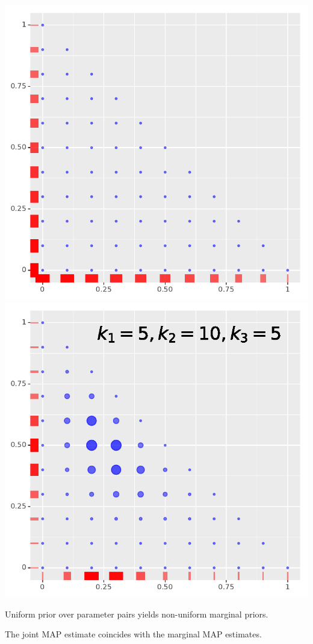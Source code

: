 \documentclass[landscape,footrule]{foils}
\begin{document}
\centerline{
\includegraphics[scale=0.8]{dice_uprior}\hspace*{1cm}
\includegraphics[scale=0.8]{dice_posterior}}

\begin{triangles}
\item Uniform prior over parameter pairs yields non-uniform marginal priors.
\item The joint MAP estimate coincides with the marginal MAP estimates.  
\end{triangles}
\end{document}
